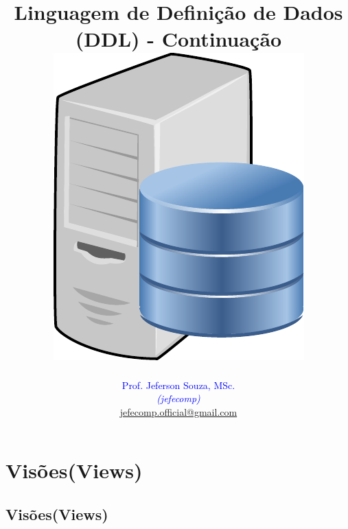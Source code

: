 \documentclass[xcolor=x11names,compress]{beamer}
\begin{document}
\title[Linguagem de Definição de Dados (DDL) \hskip20mm \insertframenumber / \inserttotalframenumber  \hskip33.5mm \inserttitlegraphic]{Linguagem de Definição de Dados (DDL) - Continuação \\[4mm]
\includegraphics[keepaspectratio,width=.25\textwidth]{database-server}}
\author[@2018 Prof. Jeferson Souza, MSc (jefecomp) - All rights reserved.]{
	\textcolor{blue}{Prof. Jeferson Souza, MSc.} \\[1mm] 
	\textcolor{blue}{\textit{{\footnotesize (jefecomp) }}}\\[1.5mm]
	 \underline{{\footnotesize jefecomp.official@gmail.com}}
	 \vspace*{1mm}
}

\date{}


\begin{frame}
\titlepage
\end{frame}


\section{Visões(Views)}
\subsection{Visões(Views)}
\end{document}
